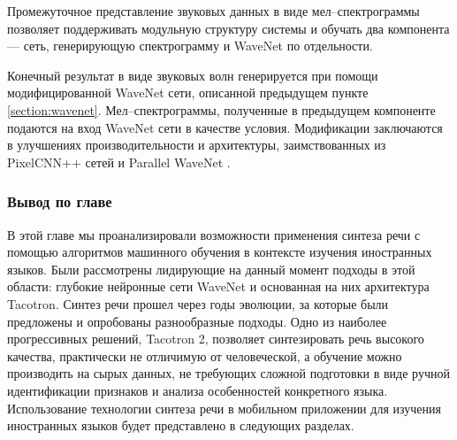 Промежуточное представление звуковых данных в виде мел--спектрограммы позволяет поддерживать модульную структуру системы и обучать два компонента --- сеть, генерирующую спектрограмму и WaveNet по отдельности.

Конечный результат в виде звуковых волн генерируется при помощи модифицированной WaveNet сети, описанной предыдущем пункте \ref{section:wavenet}. Мел--спектрограммы, полученные в предыдущем компоненте подаются на вход WaveNet сети в качестве условия. Модификации заключаются в улучшениях производительности и архитектуры, заимствованных из PixelCNN++ сетей \cite{salimans2017pixelcnn++} и Parallel WaveNet \cite{oord2018parallel}.

\subsubsection{Вывод по главе}
В этой главе мы проанализировали возможности применения синтеза речи с помощью алгоритмов машинного обучения в контексте изучения иностранных языков. Были рассмотрены лидирующие на данный момент подходы в этой области: глубокие нейронные сети WaveNet и основанная на них архитектура Tacotron. Синтез речи прошел через годы эволюции, за которые были предложены и опробованы разнообразные подходы. Одно из наиболее прогрессивных решений, Tacotron 2, позволяет синтезировать речь высокого качества, практически не отличимую от человеческой, а обучение можно производить на сырых данных, не требующих сложной подготовки в виде ручной идентификации признаков и анализа особенностей конкретного языка. Использование технологии синтеза речи в мобильном приложении для изучения иностранных языков будет представлено в следующих разделах.
